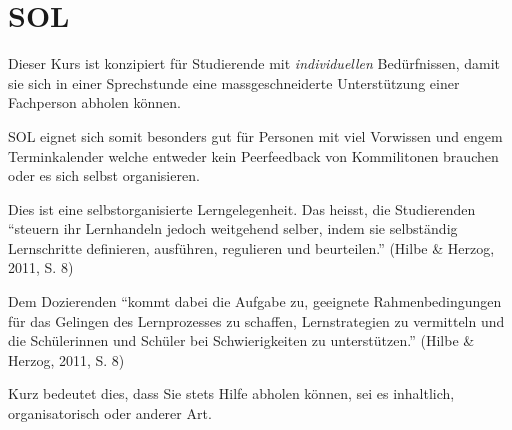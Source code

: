 \documentclass[
  10pt,
  a4paper,
  DIV=11,
  oneside]{scrartcl}
\begin{document}
\section{SOL}

\begin{tcolorbox}[enhanced jigsaw, opacitybacktitle=0.6, titlerule=0mm, left=2mm, colbacktitle=quarto-callout-note-color!10!white, breakable, opacityback=0, bottomtitle=1mm, arc=.35mm, colframe=quarto-callout-note-color-frame, title=\textcolor{quarto-callout-note-color}{\faInfo}\hspace{0.5em}{Zielgruppe}, toptitle=1mm, rightrule=.15mm, colback=white, bottomrule=.15mm, toprule=.15mm, leftrule=.75mm, coltitle=black]

Dieser Kurs ist konzipiert für Studierende mit \emph{individuellen}
Bedürfnissen, damit sie sich in einer Sprechstunde eine
massgeschneiderte Unterstützung einer Fachperson abholen können.

SOL eignet sich somit besonders gut für Personen mit viel Vorwissen und
engem Terminkalender welche entweder kein Peerfeedback von Kommilitonen
brauchen oder es sich selbst organisieren.

\end{tcolorbox}

\begin{tcolorbox}[enhanced jigsaw, opacitybacktitle=0.6, titlerule=0mm, left=2mm, colbacktitle=quarto-callout-tip-color!10!white, breakable, opacityback=0, bottomtitle=1mm, arc=.35mm, colframe=quarto-callout-tip-color-frame, title=\textcolor{quarto-callout-tip-color}{\faLightbulb}\hspace{0.5em}{Selbstorganisiertes Lernen (SOL-Kurs)}, toptitle=1mm, rightrule=.15mm, colback=white, bottomrule=.15mm, toprule=.15mm, leftrule=.75mm, coltitle=black]

Dies ist eine selbstorganisierte Lerngelegenheit. Das heisst, die
Studierenden ``steuern ihr Lernhandeln jedoch weitgehend selber, indem
sie selbständig Lernschritte definieren, ausführen, regulieren und
beurteilen.'' (Hilbe \& Herzog, 2011, S. 8)

Dem Dozierenden ``kommt dabei die Aufgabe zu, geeignete
Rahmenbedingungen für das Gelingen des Lernprozesses zu schaffen,
Lernstrategien zu vermitteln und die Schülerinnen und Schüler bei
Schwierigkeiten zu unterstützen.'' (Hilbe \& Herzog, 2011, S. 8)

Kurz bedeutet dies, dass Sie stets Hilfe abholen können, sei es
inhaltlich, organisatorisch oder anderer Art.

\end{tcolorbox}
\end{document}

